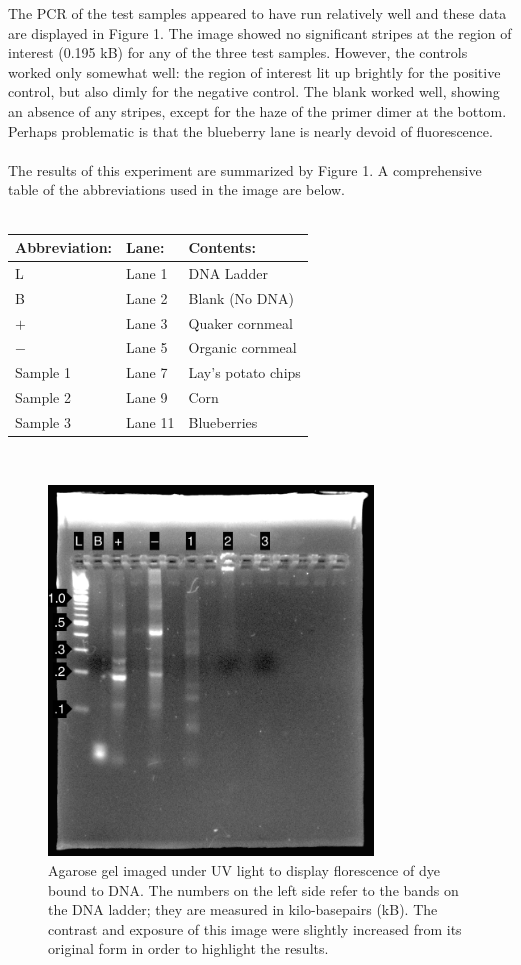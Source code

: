 \documentclass{article}
\begin{document}
The PCR of the test samples appeared to have run relatively well and these data are displayed in Figure 1. The image showed no significant stripes at the region of interest (0.195 kB) for any of the three test samples. However, the controls worked only somewhat well: the region of interest lit up brightly for the positive control, but also dimly for the negative control. The blank worked well, showing an absence of any stripes, except for the haze of the primer dimer at the bottom. Perhaps problematic is that the blueberry lane is nearly devoid of fluorescence.\\
\\
The results of this experiment are summarized by Figure 1. A comprehensive table of the abbreviations used in the image are below. \\
\\
\begin{tabular}{l l l}
Abbreviation: & Lane: & Contents: \\
\hline
L & Lane 1 & DNA Ladder \\
B & Lane 2 & Blank (No DNA) \\
$+$ & Lane 3 & Quaker cornmeal \\
$-$ & Lane 5 & Organic cornmeal \\
Sample 1 & Lane 7 & Lay's potato chips \\
Sample 2 & Lane 9 & Corn \\
Sample 3 & Lane 11 & Blueberries \\
\end{tabular}
\\
\begin{figure}[h]
\begin{center}
\includegraphics[width=0.77\textwidth]{M6gel} %
\caption{Agarose gel imaged under UV light to display florescence of dye bound to DNA. The numbers on the left side refer to the bands on the DNA ladder; they are measured in kilo-basepairs (kB). The contrast and exposure of this image were slightly increased from its original form in order to highlight the results.}
\end{center}
\end{figure}
\end{document}
